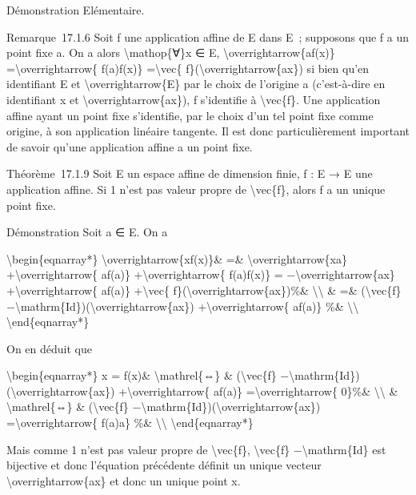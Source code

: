 \documentclass[]{article}
\begin{document}
Démonstration Elémentaire.

Remarque~17.1.6 Soit f une application affine de E dans E~; supposons
que f a un point fixe a. On a alors \textbackslash{}mathop\{∀\}x ∈ E,
\textbackslash{}overrightarrow\{af(x)\}
=\textbackslash{}overrightarrow\{ f(a)f(x)\} =\textbackslash{}vec\{
f\}(\textbackslash{}overrightarrow\{ax\}) si bien qu'en identifiant E et
\textbackslash{}overrightarrow\{E\} par le choix de l'origine a
(c'est-à-dire en identifiant x et \textbackslash{}overrightarrow\{ax\}),
f s'identifie à \textbackslash{}vec\{f\}. Une application affine ayant
un point fixe s'identifie, par le choix d'un tel point fixe comme
origine, à son application linéaire tangente. Il est donc
particulièrement important de savoir qu'une application affine a un
point fixe.

Théorème~17.1.9 Soit E un espace affine de dimension finie, f : E → E
une application affine. Si 1 n'est pas valeur propre de
\textbackslash{}vec\{f\}, alors f a un unique point fixe.

Démonstration Soit a ∈ E. On a

\textbackslash{}begin\{eqnarray*\}
\textbackslash{}overrightarrow\{xf(x)\}\& =\&
\textbackslash{}overrightarrow\{xa\} +\textbackslash{}overrightarrow\{
af(a)\} +\textbackslash{}overrightarrow\{ f(a)f(x)\} =
−\textbackslash{}overrightarrow\{ax\} +\textbackslash{}overrightarrow\{
af(a)\} +\textbackslash{}vec\{
f\}(\textbackslash{}overrightarrow\{ax\})\%\&
\textbackslash{}\textbackslash{} \& =\& (\textbackslash{}vec\{f\}
−\textbackslash{}mathrm\{Id\})(\textbackslash{}overrightarrow\{ax\})
+\textbackslash{}overrightarrow\{ af(a)\} \%\&
\textbackslash{}\textbackslash{} \textbackslash{}end\{eqnarray*\}

On en déduit que

\textbackslash{}begin\{eqnarray*\} x = f(x)\&
\textbackslash{}mathrel\{⇔\} \& (\textbackslash{}vec\{f\}
−\textbackslash{}mathrm\{Id\})(\textbackslash{}overrightarrow\{ax\})
+\textbackslash{}overrightarrow\{ af(a)\}
=\textbackslash{}overrightarrow\{ 0\}\%\&
\textbackslash{}\textbackslash{} \& \textbackslash{}mathrel\{⇔\} \&
(\textbackslash{}vec\{f\}
−\textbackslash{}mathrm\{Id\})(\textbackslash{}overrightarrow\{ax\})
=\textbackslash{}overrightarrow\{ f(a)a\} \%\&
\textbackslash{}\textbackslash{} \textbackslash{}end\{eqnarray*\}

Mais comme 1 n'est pas valeur propre de \textbackslash{}vec\{f\},
\textbackslash{}vec\{f\} −\textbackslash{}mathrm\{Id\} est bijective et
donc l'équation précédente définit un unique vecteur
\textbackslash{}overrightarrow\{ax\} et donc un unique point x.
\end{document}
